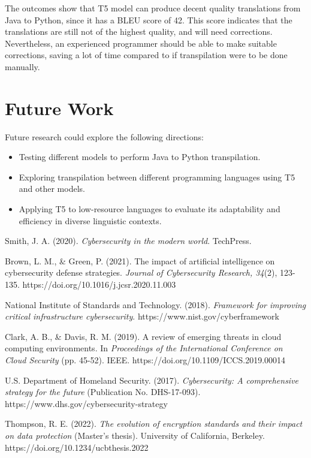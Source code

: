 \documentclass{dhbenelux}
\begin{document}
The outcomes show that T5 model can produce decent quality translations from Java to Python, since it has a BLEU score of 42. This score indicates that the translations are still not of the highest quality, and will need corrections. Nevertheless, an experienced programmer should be able to make suitable corrections, saving a lot of time compared to if transpilation were to be done manually.

\section{Future Work}
Future research could explore the following directions:
\begin{itemize}
    \item Testing different models to perform Java to Python transpilation.
    \item Exploring transpilation between different programming languages using T5 and other models.
    \item Applying T5 to low-resource languages to evaluate its adaptability and efficiency in diverse linguistic contexts.
\end{itemize}

\begin{thebibliography}{99}

Smith, J. A. (2020). \textit{Cybersecurity in the modern world}. TechPress.

Brown, L. M., \& Green, P. (2021). The impact of artificial intelligence on cybersecurity defense strategies. \textit{Journal of Cybersecurity Research, 34}(2), 123-135. https://doi.org/10.1016/j.jcsr.2020.11.003

National Institute of Standards and Technology. (2018). \textit{Framework for improving critical infrastructure cybersecurity}. https://www.nist.gov/cyberframework

Clark, A. B., \& Davis, R. M. (2019). A review of emerging threats in cloud computing environments. In \textit{Proceedings of the International Conference on Cloud Security} (pp. 45-52). IEEE. https://doi.org/10.1109/ICCS.2019.00014

U.S. Department of Homeland Security. (2017). \textit{Cybersecurity: A comprehensive strategy for the future} (Publication No. DHS-17-093). https://www.dhs.gov/cybersecurity-strategy

Thompson, R. E. (2022). \textit{The evolution of encryption standards and their impact on data protection} (Master’s thesis). University of California, Berkeley. https://doi.org/10.1234/ucbthesis.2022

\end{thebibliography}
\end{document}
